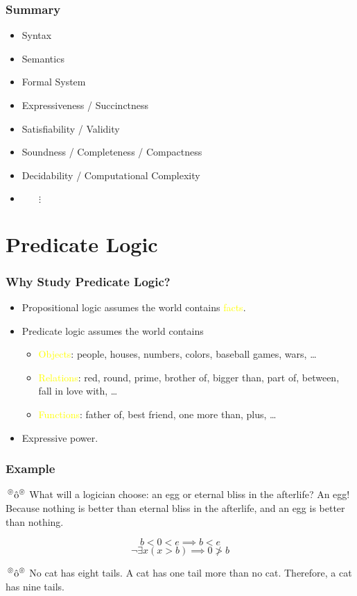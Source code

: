 \documentclass[UTF8,11pt,colorlinks,compress,openany]{beamer}%
\begin{document}
\begin{frame}\frametitle{Summary}
	\begin{itemize}
		\item Syntax
		\item Semantics
		\item Formal System
	\end{itemize}
	\begin{itemize}
		\item Expressiveness / Succinctness
		\item Satisfiability / Validity
		\item Soundness / Completeness / Compactness
		\item Decidability / Computational Complexity
		\item $\phantom{Dec}\vdots$
	\end{itemize}
\end{frame}


\section{Predicate Logic}


\begin{frame}\frametitle{Why Study Predicate Logic?}
	\begin{itemize}
		\item Propositional logic assumes the world contains \textcolor{yellow}{facts}.
		\item Predicate logic assumes the world contains
		\begin{itemize}
			\item \textcolor{yellow}{Objects}: people, houses, numbers, colors, baseball games, wars, \dots
			\item \textcolor{yellow}{Relations}: red, round, prime, brother of, bigger than, part of, between, fall in love with, \dots
			\item \textcolor{yellow}{Functions}: father of, best friend, one more than, plus, \dots
		\end{itemize}
		\item Expressive power.
	\end{itemize}
\end{frame}

\begin{frame}\frametitle{Example}
	\begin{block}{$\sideset{^\circledcirc}{^\circledcirc}{\operatorname{\hat{o}}}$}
		What will a logician choose: an egg or eternal bliss in the afterlife? An egg! Because nothing is better than eternal bliss in the afterlife, and an egg is better than nothing.
	\end{block}
	\[b<0<e\implies b<e\]
	\[\neg\exists x(x>b)\implies 0\ngtr b\]
	\begin{block}{$\sideset{^\circledcirc}{^\circledcirc}{\operatorname{\hat{o}}}$}
		No cat has eight tails. A cat has one tail more than no cat. Therefore, a cat has nine tails.
	\end{block}
\end{frame}
\end{document}
